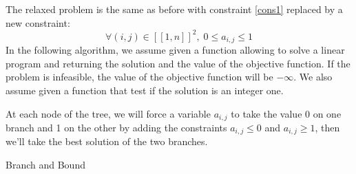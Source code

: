 \documentclass[english]{article}
\begin{document}
The relaxed problem is the same as before with constraint \ref{cons1} replaced by a new constraint:
\begin{equation}\label{cons6}
    \forall (i, j) \in {[\![1, n]\!]}^2, \; 0 \leq a_{i,j} \leq 1
\end{equation}
In the following algorithm, we assume given a function allowing to solve a linear program and returning the solution and the value of the objective function. If the problem is infeasible, the value of the objective function will be $ - \infty $. We also assume given a function that test if the solution is an integer one. 

At each node of the tree, we will force a variable $ a_{i, j} $ to take the value 0 on one branch and 1 on the other by adding the constraints $ a_{i, j} \leq 0 $ and $ a_{i, j} \geq 1 $, then we'll take the best solution of the two branches.
\begin{algorithm}

    \caption{Branch and Bound}
    


    
\end{algorithm}
\end{document}
